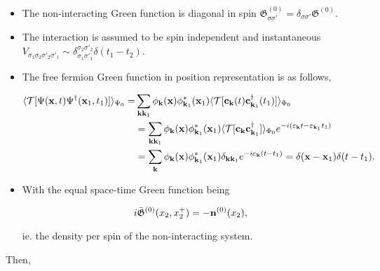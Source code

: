 \begin{itemize}
    \item The non-interacting Green function is diagonal in spin $\mathfrak{G}_{\sigma \sigma'}^{(0)} = \delta_{\sigma \sigma'} \mathfrak{G}^{(0)}$.
    \item The interaction is assumed to be spin independent and instantaneous $V_{\sigma_1 \sigma_2 \sigma'_2 \sigma'_1} \sim \delta_{\sigma_1 \sigma'_1}^{\sigma_2 \sigma'_2} \delta(t_1-t_2)$.
    \item The free fermion Green function in position representation is as follows, 
    
\begin{equation}
    \begin{split}
        \langle \mathcal{T} [\Psi({\bf x},t) \Psi^\dagger({\bf x}_1, t_1)] \rangle_{\Psi_0} =& \sum_{{\bf k} {\bf k}_1} \phi_{{\bf k}}({\bf x})\phi^{*}_{{\bf k}_1}({\bf x}_1) \langle \mathcal{T} [{\bf c}_{{\bf k}}(t) {\bf c}_{{\bf k}_1}^\dagger(t_1)] \rangle_{\Phi_0} \\
        &= \sum_{{\bf k} {\bf k}_1} \phi_{{\bf k}}({\bf x})\phi^{*}_{{\bf k}_1}({\bf x}_1) \langle \mathcal{T} [{\bf c}_{{\bf k}} {\bf c}_{{\bf k}_1}^\dagger] \rangle_{\Phi_0} e^{-i(\varepsilon_{{\bf k}}t - {\varepsilon}_{{\bf k}_1} t_1)} \\
        &= \sum_{{\bf k}} \phi_{{\bf k}}({\bf x})\phi^{*}_{{\bf k}_1}({\bf x}_1) \delta_{{\bf k} {\bf k}_1} e^{-i\varepsilon_{{\bf k}}(t-t_1)} = \delta({\bf x} - {\bf x}_1) \delta(t-t_1). 
    \end{split}
\end{equation}

\item With the equal space-time Green function being 

\begin{equation}
    i \bar{\mathfrak{G}}^{(0)}(x_2, x_2^+) = - {\bf n}^{(0)}(x_2),
\end{equation}

        ie. the density per spin of the non-interacting system. 
\end{itemize}

Then,

